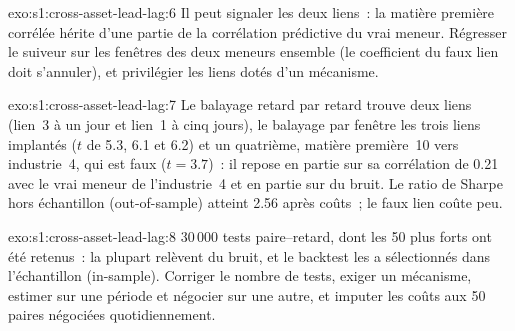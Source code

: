 \begin{solution}{exo:s1:cross-asset-lead-lag:6}
Il peut signaler les deux liens~: la matière première corrélée hérite d'une partie de la corrélation prédictive du vrai meneur. Régresser le suiveur sur les fenêtres des deux meneurs
ensemble (le coefficient du faux lien doit s'annuler), et privilégier les liens dotés d'un mécanisme.
\end{solution}

\begin{solution}{exo:s1:cross-asset-lead-lag:7}
Le balayage retard par retard trouve deux liens (lien~3 à un jour et lien~1 à cinq jours), le balayage par fenêtre les trois liens implantés ($t$ de 5.3, 6.1 et 6.2) et un
quatrième, matière première~10 vers industrie~4, qui est faux ($t = 3.7$)~: il repose en partie sur sa corrélation de 0.21 avec le vrai meneur de l'industrie~4 et
en partie sur du bruit. Le ratio de Sharpe hors échantillon (out-of-sample) atteint 2.56 après coûts~; le faux lien coûte peu.
\end{solution}

\begin{solution}{exo:s1:cross-asset-lead-lag:8}
30\,000 tests paire--retard, dont les 50 plus forts ont été retenus~: la plupart relèvent du bruit, et le backtest les a sélectionnés dans l'échantillon (in-sample). Corriger le nombre de tests, exiger
un mécanisme, estimer sur une période et négocier sur une autre, et imputer les coûts aux 50 paires négociées quotidiennement.
\end{solution}

